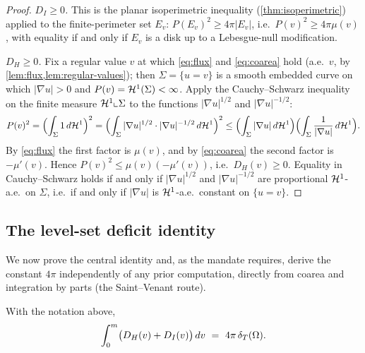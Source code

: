 \begin{proof}
\emph{$D_I\ge0$.} This is the planar isoperimetric inequality
(\cref{thm:isoperimetric}) applied to the finite-perimeter set $E_v$:
$P(E_v)^2\ge4\pi|E_v|$, i.e.\ $P(v)^2\ge4\pi\mu(v)$, with equality if and
only if $E_v$ is a disk up to a Lebesgue-null modification.

\emph{$D_H\ge0$.} Fix a regular value $v$ at which \eqref{eq:flux} and
\eqref{eq:coarea} hold (a.e.\ $v$, by \cref{lem:flux,lem:regular-values}); then
$\Sigma=\{u=v\}$ is a smooth embedded curve on which $|\nabla u|>0$ and
$P(v)=\mathcal{H}^1(\Sigma)<\infty$. Apply the Cauchy--Schwarz inequality
on the finite measure $\mathcal{H}^1\llcorner\Sigma$ to the functions
$|\nabla u|^{1/2}$ and $|\nabla u|^{-1/2}$:
\[
   P(v)^2
   =\Bigl(\int_{\Sigma}1\,d\mathcal{H}^1\Bigr)^2
   =\Bigl(\int_{\Sigma}|\nabla u|^{1/2}\cdot|\nabla u|^{-1/2}\,d\mathcal{H}^1\Bigr)^2
   \le\Bigl(\int_{\Sigma}|\nabla u|\,d\mathcal{H}^1\Bigr)
      \Bigl(\int_{\Sigma}\frac{1}{|\nabla u|}\,d\mathcal{H}^1\Bigr).
\]
By \eqref{eq:flux} the first factor is $\mu(v)$, and by \eqref{eq:coarea} the
second factor is $-\mu'(v)$. Hence $P(v)^2\le\mu(v)(-\mu'(v))$, i.e.\
$D_H(v)\ge0$. Equality in
Cauchy--Schwarz holds if and only if $|\nabla u|^{1/2}$ and
$|\nabla u|^{-1/2}$ are proportional $\mathcal{H}^1$-a.e.\ on $\Sigma$, i.e.\ if and
only if $|\nabla u|$ is $\mathcal{H}^1$-a.e.\ constant on $\{u=v\}$.
\end{proof}

\subsection{The level-set deficit identity}

We now prove the central identity and, as the mandate requires, derive the
constant $4\pi$ independently of any prior computation, directly from coarea
and integration by parts (the Saint--Venant route).

\begin{theorem}\label{thm:level-identity}
With the notation above,
\begin{equation}\label{eq:level-identity}
   \int_0^m\bigl(D_H(v)+D_I(v)\bigr)\,dv\ =\ 4\pi\,\dT(\Om).
\end{equation}
\end{theorem}

